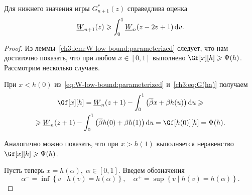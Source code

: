 {\begin{theorem}\label{ch3:thm:W-bound}
  Для нижнего значения игры $G_{n+1}^*(z)$ справедлива оценка
  \begin{equation*}
    \LW{n+1}(z) \geqslant \int_0^1 \LW{n}(z - 2v + 1) \di v.
  \end{equation*}
\end{theorem}
\begin{proof}
  Из леммы~\ref{ch3:lem:W-low-bound:parameterized} следует, что нам достаточно показать, что при любом $x \in [0, 1]$ выполнено $\Gf[x][h] \geqslant \Psi(h)$.
  Рассмотрим несколько случаев.

  При $x < h(0)$ из~\eqref{eq:W-low-bound:parameterized} и~\eqref{ch3:eq:G(ha)} получаем
  \begin{multline*}
    \Gf[x][h] =
    \LW{n}(z + 1) - \int_0^1 \left( \DCo x + \Co h(u) \right) \di u \geqslant \\
    \geqslant \LW{n}(z + 1) - \int_0^1 \left( \DCo h(0) + \Co h(1) \right) \di
    u = \Gf[h(0)][h] = \Psi(h).
  \end{multline*}

  Аналогично можно показать, что при $x > h(1)$ выполняется неравенство $\Gf[x][h] \geqslant \Psi(h)$.

  Пусть теперь $x = h(\alpha), \; \alpha \in [0, 1]$. Введем обозначения
  \[
    \alpha^- = \inf \left\{ v \;|\; h(v) = h(\alpha) \right\}, \quad \alpha^+ =
    \sup \left\{ v \;|\; h(v) = h(\alpha) \right\}.
  \]
  

\end{proof}}
